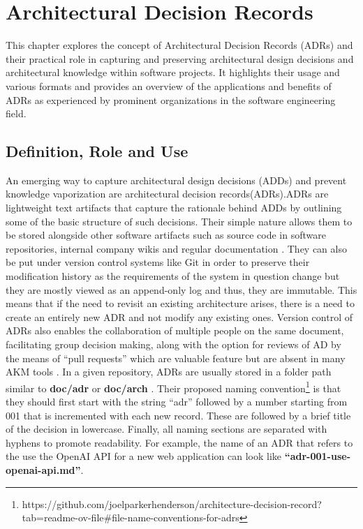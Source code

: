 \chapter{Architectural Decision Records}

    This chapter explores the concept of Architectural Decision Records (ADRs) and their practical role in capturing and preserving architectural design decisions and architectural knowledge within software projects. It highlights their usage and various formats and provides an overview of the applications and benefits of ADRs as experienced by prominent organizations in the software engineering field.


    \section{Definition, Role and Use}
        An emerging way to capture architectural design decisions (ADDs) and prevent knowledge vaporization are architectural decision records(ADRs).\allowbreak ADRs are lightweight text artifacts that capture the rationale behind ADDs by outlining some of the basic structure of such decisions\cite{MarkdownADRs}. Their simple nature allows them to be stored alongside other software artifacts such as source code in software repositories, internal company wikis and regular documentation \cite{DOCUMENTING_ARCHITECTURE_DECISIONS}. They can also be put under version control systems like Git in order to preserve their modification history as the requirements of the system in question change but they are mostly viewed as an append-only log \cite{microsoftArchitectureDecision} and thus, they are immutable. This means that if the need to revisit an existing architecture arises, there is a need to create an entirely new ADR and not modify any existing ones. Version control of ADRs also enables the collaboration of multiple people on the same document, facilitating group decision making, along with the option for reviews of AD by the means of ``pull requests'' which are valuable feature but are absent in many AKM tools \cite{compare_study_adr_tools}. In a given repository, ADRs are usually stored in a folder path similar to \textbf{doc/adr} or \textbf{doc/arch} \cite{github_page_adrs}. Their proposed naming convention\footnote{https://github.com/joelparkerhenderson/architecture-decision-record?tab=readme-ov-file\#file-name-conventions-for-adrs} is that they should first start with the string ``adr'' followed by a number starting from 001 that is incremented with each new record. These are followed by a brief title of the decision in lowercase. Finally, all naming sections are separated with hyphens to promote readability. For example, the name of an ADR that refers to the use the OpenAI API for a new web application can look like \textbf{``adr-001-use-openai-api.md''}.
        
